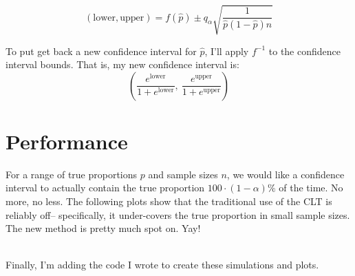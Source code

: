 \documentclass{article}
\begin{document}
$$(\text{lower}, \text{upper}) = f(\hat{p}) \pm q_\alpha\sqrt{\frac{1}{\hat{p}(1-\hat{p})n}}$$

To put get back a new confidence interval for $\hat{p}$, I'll apply $f^{-1}$ to the confidence interval bounds. That is, my new confidence interval is:$$\left(\frac{e^\text{lower}}{1+e^\text{lower}},\ \frac{e^\text{upper}}{1+e^\text{upper}}\right)$$

\section*{Performance}

For a range of true proportions $p$ and sample sizes $n$, we would like a confidence interval to actually contain the true proportion $100\cdot(1-\alpha)\%$ of the time. No more, no less. The following plots show that the traditional use of the CLT is reliably off-- specifically, it under-covers the true proportion in small sample sizes. The new method is pretty much spot on. Yay!

\ \\
Finally, I'm adding the code I wrote to create these simulations and plots.
\end{document}
